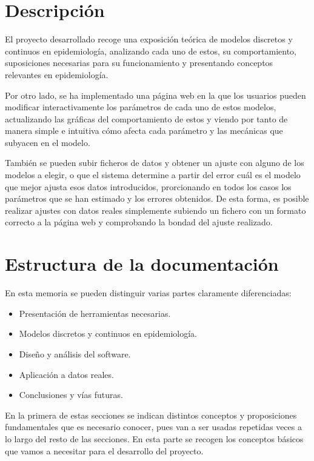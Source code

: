\section{Descripción}

El proyecto desarrollado recoge una exposición teórica de modelos discretos y continuos en epidemiología, analizando cada uno de estos, su comportamiento, suposiciones necesarias para su funcionamiento y presentando conceptos relevantes en epidemiología.

Por otro lado, se ha implementado una página web en la que los usuarios pueden modificar interactivamente los parámetros de cada uno de estos modelos, actualizando las gráficas del comportamiento de estos y viendo por tanto de manera simple e intuitiva cómo afecta cada parámetro y las mecánicas que subyacen en el modelo.

También se pueden subir ficheros de datos y obtener un ajuste con alguno de los modelos a elegir, o que el sistema determine a partir del error cuál es el modelo que mejor ajusta esos datos introducidos, prorcionando en todos los casos los parámetros que se han estimado y los errores obtenidos. De esta forma, es posible realizar ajustes con datos reales simplemente subiendo un fichero con un formato correcto a la página web y comprobando la bondad del ajuste realizado.


\section{Estructura de la documentación}

En esta memoria se pueden distinguir varias partes claramente diferenciadas:

\begin{itemize}
\item Presentación de herramientas necesarias.
\item Modelos discretos y continuos en epidemiología.
\item Diseño y análisis del software.
\item Aplicación a datos reales.
\item Conclusiones y vías futuras.
\end{itemize}

En la primera de estas secciones se indican distintos conceptos y proposiciones fundamentales que es necesario conocer, pues van a ser usadas repetidas veces a lo largo del resto de las secciones. En esta parte se recogen los conceptos básicos que vamos a necesitar para el desarrollo del proyecto.

